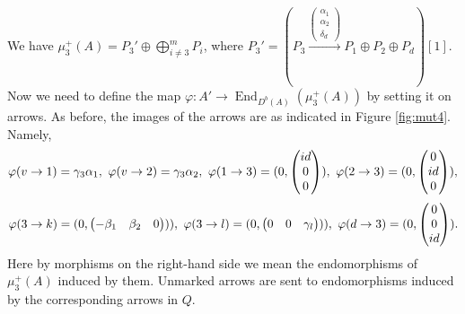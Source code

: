\documentclass[12pt]{amsart}
\theoremstyle{plain}
\theoremstyle{remark}
\theoremstyle{definition}
\newcommand{\End}{\mathop{\mathrm{End}}\nolimits}
\begin{document}
\begin{enumerate}
We have ${\mu_3^+(A) = P_3' \oplus \bigoplus_{i\neq 3}^m P_i}$, where ${P_3' = (P_3 \xrightarrow{\begin{pmatrix} \alpha_1 \\ \alpha_2 \\ \delta_d \end{pmatrix}} P_1 \oplus P_2 \oplus P_d)[1]}$. Now we need to define the map $\varphi \colon A' \xrightarrow{} \End_{D^b(A)}(\mu_3^+(A))$ by setting it on arrows. As before, the images of the arrows are as indicated in Figure \ref{fig:mut4}. Namely, $$\varphi(v \to 1) = \gamma_3\alpha_1, \,\, \varphi(v \to 2) = \gamma_3\alpha_2,  \,\, \varphi(1 \to 3) = (0, {\footnotesize \begin{pmatrix} id \\ 0 \\ 0 \end{pmatrix}}),  \,\, \varphi(2 \to 3) = ( 0,{\footnotesize  \begin{pmatrix} 0 \\ id \\ 0 \end{pmatrix}}), $$ $$ \varphi(3 \to k) = (0, \begin{pmatrix} -\beta_1 & \beta_2 & 0 \end{pmatrix})),  \,\, \varphi(3 \to l) = (0, \begin{pmatrix} 0 & 0 & \gamma_l \end{pmatrix})),  \,\, \varphi(d \to 3) = (0, {\footnotesize \begin{pmatrix} 0 \\ 0 \\ id \end{pmatrix}}).$$
Here by morphisms on the right-hand side we mean the endomorphisms of $\mu_3^+(A)$ induced by them. Unmarked arrows are sent to endomorphisms induced by the corresponding arrows in $Q$. 


\end{enumerate}
\end{document}
